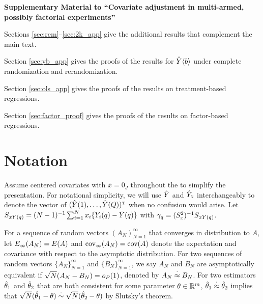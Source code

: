 \documentclass[11pt]{article}
\theoremstyle{definition}
\begin{document}
\setcounter{page}{1}

  \setcounter{equation}{0}
\renewcommand {\theequation} {S\arabic{equation}}
  \setcounter{lemma}{0}
\renewcommand {\thelemma} {S\arabic{lemma}}
   \setcounter{definition}{0}
\renewcommand {\thedefinition} {S\arabic{definition}}
   \setcounter{example}{0}
\renewcommand {\theexample} {S\arabic{example}}
   \setcounter{proposition}{0}
\renewcommand {\theproposition} {S\arabic{proposition}}
   \setcounter{corollary}{0}
\renewcommand {\thecorollary} {S\arabic{corollary}}

 

\begin{center}
\bf \Large 
Supplementary Material  to ``Covariate adjustment in multi-armed, possibly factorial experiments''
\end{center}

Sections \ref{sec:rem}--\ref{sec:2k_app} give  the additional results that complement the main text. 

Section \ref{sec:yb_app} gives the proofs of the results for $\hat Y\langle b \rangle$ under complete randomization and rerandomization.

Section \ref{sec:ols_app} gives the proofs of the results on treatment-based regressions. 

Section \ref{sec:factor_proof} gives the proofs of the results on factor-based regressions. 

\section*{Notation}
Assume centered covariates with $\bar x=0_J$ throughout the {\sm} to simplify the presentation. 
For notational simplicity, we will use $ \hat Y$ and $\hat Y_{\textsc{n}}$ interchangeably to denote the vector of $(\hat Y(1), \ldots, \hat Y(Q))^{ \mathrm{\scriptscriptstyle T} }$ when no confusion would arise. 
Let $S_{xY(q)} =  (N-1)^{-1} \sum_{i=1}^N  x_i \{Y_i(q)-\bar Y(q)\}$ with $\gamma_q  = (S_x^2)^{-1} S_{xY(q)}$. 

For a sequence of random vectors $(A_N)_{N=1}^\infty$ that converges in distribution to $A$,
let $E_\infty(A_N) = E(A)$ and $\text{cov}_\infty(A_N) = \text{cov}(A)$ denote the expectation  and covariance  with respect to the asymptotic distribution.
For two sequences of random vectors $\{A_N\}_{N=1}^\infty$ and $\{B_N\}_{N=1}^\infty$, 
we say $A_N$ and $B_N$ are asymptotically equivalent if $\sqrt N (A_N -  B_N) = o_P(1)$, denoted by $A_N \overset{\cdot}{\approx} B_N$. 
For two estimators $\hat\theta_1$ and $\hat\theta_2$ that are both consistent for some parameter $\theta \in \mathbb R^m$, $\hat\theta_1 \overset{\cdot}{\approx} \hat\theta_2$ implies that $\sqrt N (\hat\theta_1 - \theta) \overset{\cdot}{\sim} \sqrt N (\hat\theta_2 - \theta)$ by Slutsky's theorem.
\end{document}
